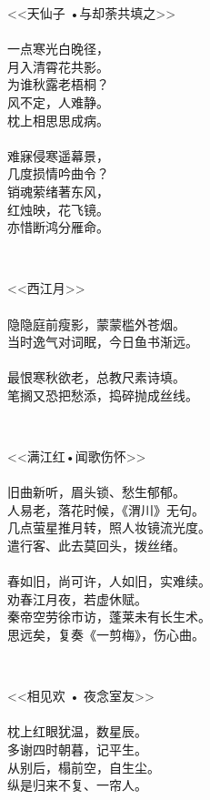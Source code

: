 \documentclass[12pt,a4paper]{article}
\begin{document}
\begin{center}
<<天仙子 •与却荼共填之>>\\
\qquad\\
一点寒光白晚径，\\
月入清霄花共影。\\
为谁秋露老梧桐？\\
风不定，人难静。\\
枕上相思思成病。\\
\qquad\\
难寐侵寒遥幕景，\\
几度损情吟曲令？\\
销魂萦绪著东风，\\
红烛映，花飞镜。\\
亦惜断鸿分雁命。\\
\end{center}
\qquad\\
\begin{center}
<<西江月>>\\
\qquad \\
隐隐庭前瘦影，蒙蒙槛外苍烟。\\
当时逸气对词眠，今日鱼书渐远。\\
\qquad \\
最恨寒秋欲老，总教尺素诗填。\\
笔搁又恐把愁添，捣碎抛成丝线。\\
\end{center}
\qquad\\
\begin{center}
<<满江红•闻歌伤怀>>\\
\qquad \\
旧曲新听，眉头锁、愁生郁郁。\\
人易老，落花时候，《渭川》无句。\\
几点萤星推月转，照人妆镜流光度。\\
遣行客、此去莫回头，拨丝绪。\\
\qquad \\
春如旧，尚可许，人如旧，实难续。\\
劝春江月夜，若虚休赋。\\
秦帝空劳徐市访，蓬莱未有长生术。\\
思远矣，复奏《一剪梅》，伤心曲。\\
\end{center}
\qquad\\
\begin{center}
<<相见欢 • 夜念室友>>\\
\qquad \\
枕上红眼犹温，数星辰。\\
多谢四时朝暮，记平生。\\
从别后，榻前空，自生尘。\\
纵是归来不复、一帘人。\\
\end{center}
\end{document}
